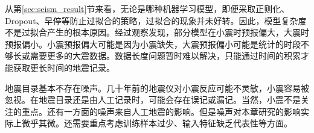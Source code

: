 从第\ref{sec:seism_result}节来看，无论是哪种机器学习模型，即便采取正则化、Dropout、早停等防止过拟合的策略，过拟合的现象并未好转。因此，模型复杂度不是过拟合产生的根本原因。经过观察发现，部分模型在小震时预报偏大，大震时预报偏小。小震预报偏大可能是因为小震缺失，大震预报偏小可能是统计的时段不够长或需要更多的大震数据。数据长度问题暂时难以解决，只能通过时间的积累才能获取更长时间的地震记录。

地震目录基本不存在噪声。几十年前的地震仪对小震反应可能不灵敏，小震容易被忽视。在地震目录还是由人工记录时，可能会存在误记或漏记。当然，小震不是关注的重点。还有一方面的噪声来自人工地震的影响。但是噪声对本章研究的影响实际上微乎其微。还需要重点考虑训练样本过少、输入特征缺乏代表性等方面。



































  

